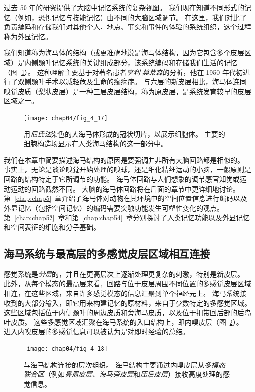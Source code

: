 过去 50 年的研究提供了大脑中记忆系统的复杂视图。 
我们现在知道不同形式的记忆（例如，恐惧记忆与技能记忆）由不同的大脑区域调节。
在这里，我们对比了负责编码和存储我们对其他个人、地点、事实和事件的体验的系统组织，这个过程称为外显记忆。


我们知道称为海马体的结构（或更准确地说是海马体结构，因为它包含多个皮层区域）是内侧颞叶记忆系统的关键组成部分，该系统编码和存储我们生活的记忆（图~\ref{fig:4_17}）。 
这种理解主要基于对著名患者\textit{亨利$\cdot$莫莱森}的分析，他在 1950 年代初进行了双侧颞叶手术以减轻危及生命的癫痫症。
与六层的新皮层相比，海马体连同嗅觉皮质（梨状皮层）是一种三层皮层结构，称为原皮层，是系统发育较早的皮层区域之一。


\begin{figure}[htbp]
	\centering
	\texttt{[image: chap04/fig\_4\_17]}
	\caption{用\textit{尼氏法}染色的人海马体形成的冠状切片，以展示细胞体。
		主要的细胞构造场显示在人类海马结构的这一部分中。}
	\label{fig:4_17}
\end{figure}


我们在本章中简要描述海马结构的原因是要强调并非所有大脑回路都是相似的。
事实上，无论是谈论嗅觉开始处理的嗅球，还是细化精细运动的小脑，一般原则是回路的结构特定于它所调节的功能。
海马体回路与人们想象的调节感官知觉或运动运动的回路截然不同。
大脑的海马体回路将在后面的章节中更详细地讨论。 
第~\ref{chap:chap5}~章介绍了海马体对动物在其环境中的空间位置信息进行编码以及外显记忆（包括空间记忆）的编码需要突触功能发生可塑性变化的观点。 
第~\ref{chap:chap52}~章和第~\ref{chap:chap54}~章分别探讨了人类记忆功能以及外显记忆和空间表征的细胞和分子基础。



\subsection{海马系统与最高层的多感觉皮层区域相互连接}

感觉系统是\textit{分层}的，并且在更高层次上逐渐处理更复杂的刺激，特别是新皮层。
此外，从每个模态的最高层来看，回路与位于皮层周围不同位置的多感觉皮层区域相连，在这些区域，来自许多感觉模态的信息汇聚到单个神经元上。
海马系统接收到的大部分输入，即它用来构建记忆的原材料，来自于少数特定的多感觉区域。
这些区域包括位于内侧颞叶的周边皮质和旁海马皮质，以及位于扣带回后部的后岛叶皮质。
这些多感觉区域汇聚在海马系统的入口结构上，即内嗅皮层（图~\ref{fig:4_18}）。 
进入内嗅皮层的多感觉信息可以被认为是对即时经验的总结。


\begin{figure}[htbp]
	\centering
	\texttt{[image: chap04/fig\_4\_18]}
	\caption{与海马结构连接的层次组织。
		海马结构主要通过内嗅皮层从\textit{多模态联合区}（例如\textit{鼻周皮层}、\textit{海马旁皮层}和\textit{压后皮层}）接收高度处理的感觉信息。}
	\label{fig:4_18}
\end{figure}



